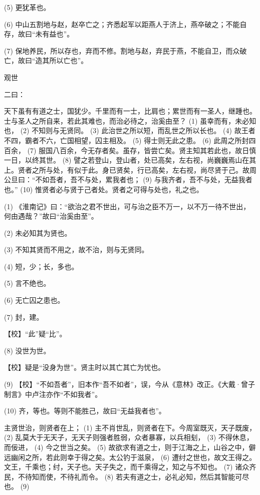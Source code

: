 \documentclass[12pt,UTF8]{ctexbook}
\begin{document}
(5) 更犹革也。

(6) 中山五割地与赵，赵卒亡之；齐悉起军以距燕人于济上，燕卒破之；不能自存，故曰“未有益也”。

(7) 保地养民，所以存也，弃而不修。割地与赵，弃民于燕，不能自卫，而众破亡，故曰“造其所以亡也”。





观世


二曰：

天下虽有有道之士，国犹少。千里而有一士，比肩也；累世而有一圣人，继踵也。士与圣人之所自来，若此其难也，而治必待之，治奚由至？ (1) 虽幸而有，未必知也， (2) 不知则与无贤同。 (3) 此治世之所以短，而乱世之所以长也。 (4) 故王者不四，霸者不六，亡国相望，囚主相及。 (5) 得士则无此之患。 (6) 此周之所封四百余， (7) 服国八百余，今无存者矣。虽存，皆尝亡矣。贤主知其若此也，故日慎一日，以终其世。 (8) 譬之若登山，登山者，处已高矣，左右视，尚巍巍焉山在其上。贤者之所与处，有似于此。身已贤矣，行已高矣，左右视，尚尽贤于己。故周公旦曰：“不如吾者，吾不与处，累我者也； (9) 与我齐者，吾不与处，无益我者也。” (10) 惟贤者必与贤于己者处。贤者之可得与处也，礼之也。

(1) 《淮南记》曰：“欲治之君不世出，可与治之臣不万一，以不万一待不世出，何由遇哉？”故曰“治奚由至”。

(2) 未必知其为贤也。

(3) 不知其贤而不用之，故不治，则与无贤同。

(4) 短，少；长，多也。

(5) 言不绝也。

(6) 无亡囚之患也。

(7) 封，建。

【校】“此”疑“比”。

(8) 没世为世。

【校】疑是“没身为世”。贤主时以其亡其亡为忧也。

(9) 【校】“不如吾者”，旧本作“吾不如者”，误，今从《意林》改正。《大戴·曾子制言》中卢注亦作“不如我者”。

(10) 齐，等也。等则不能胜己，故曰“无益我者也”。

主贤世治，则贤者在上； (1) 主不肖世乱，则贤者在下。今周室既灭，天子既废， (2) 乱莫大于无天子，无天子则强者胜弱，众者暴寡，以兵相刬， (3) 不得休息，而佞进， (4) 今之世当之矣。 (5) 故欲求有道之士，则于江海之上，山谷之中，僻远幽闲之所，若此则幸于得之矣。太公钓于滋泉， (6) 遭纣之世也，故文王得之。文王，千乘也；纣，天子也。天子失之，而千乘得之，知之与不知也。 (7) 诸众齐民，不待知而使，不待礼而令。 (8) 若夫有道之士，必礼必知，然后其智能可尽也。 (9)
\end{document}
